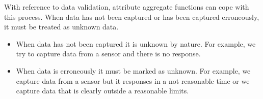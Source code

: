 With reference to data validation, attribute aggregate functions
can cope with this process. When data has not been captured or has
been captured erroneously, it must be treated as unknown data.
\begin{itemize}
\item When data has not been captured it is unknown by nature. For
  example, we try to capture data from a sensor and there is no
  response.
\item When data is erroneously it must be marked as unknown. For
  example, we capture data from a sensor but it responses in a not
  reasonable time or we capture data that is clearly outside a
  reasonable limits.
\end{itemize}





